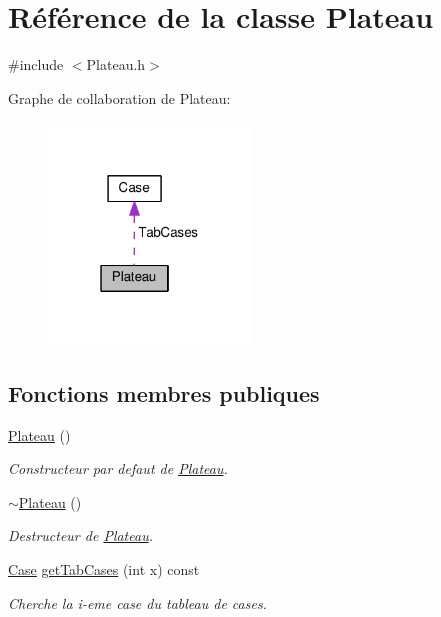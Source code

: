 \hypertarget{classPlateau}{}\section{Référence de la classe Plateau}
\label{classPlateau}


{\ttfamily \#include $<$Plateau.\+h$>$}



Graphe de collaboration de Plateau\+:
\nopagebreak
\begin{figure}[H]
\begin{center}
\leavevmode
\includegraphics[width=154pt]{classPlateau__coll__graph}
\end{center}
\end{figure}
\subsection*{Fonctions membres publiques}
\begin{DoxyCompactItemize}
\item 
\hyperlink{classPlateau_a07026170529dd928238ee45de0a797d7}{Plateau} ()
\begin{DoxyCompactList}\small\item\em Constructeur par defaut de \hyperlink{classPlateau}{Plateau}. \end{DoxyCompactList}\item 
\hyperlink{classPlateau_a0e6ae72e4d7e9923f996c1247e6a6c8b}{$\sim$\+Plateau} ()
\begin{DoxyCompactList}\small\item\em Destructeur de \hyperlink{classPlateau}{Plateau}. \end{DoxyCompactList}\item 
\hyperlink{classCase}{Case} \hyperlink{classPlateau_a89c2b3450489c02dee04dfeaad576ddd}{get\+Tab\+Cases} (int x) const 
\begin{DoxyCompactList}\small\item\em Cherche la i-\/eme case du tableau de cases. \end{DoxyCompactList}\end{DoxyCompactItemize}
